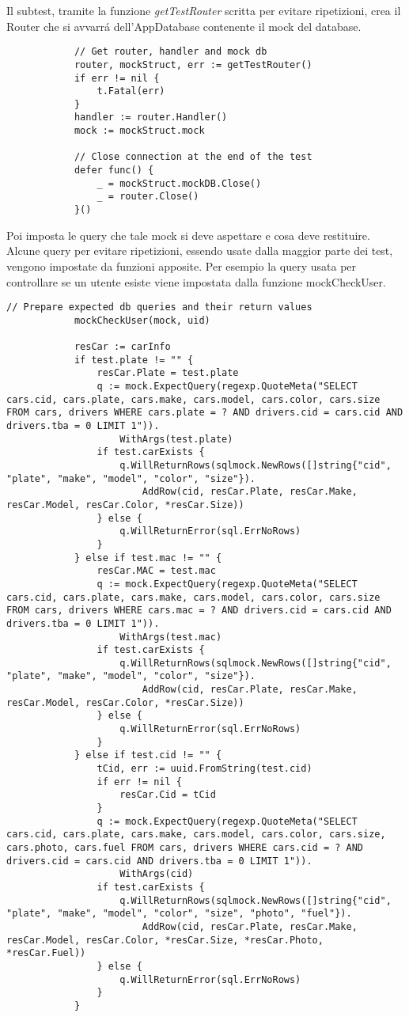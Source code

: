 \documentclass[italian, oneside]{sapthesis} %
\begin{document}
		Il subtest, tramite la funzione \textit{getTestRouter} scritta per evitare ripetizioni, crea il Router che si avvarr\'a dell'AppDatabase contenente il mock del database.

		\begin{lstlisting}
			// Get router, handler and mock db
			router, mockStruct, err := getTestRouter()
			if err != nil {
				t.Fatal(err)
			}
			handler := router.Handler()
			mock := mockStruct.mock

			// Close connection at the end of the test
			defer func() {
				_ = mockStruct.mockDB.Close()
				_ = router.Close()
			}()
		\end{lstlisting}

		\pagebreak
		Poi imposta le query che tale mock si deve aspettare e cosa deve restituire. Alcune query per evitare ripetizioni, essendo usate dalla maggior parte dei test, vengono impostate da funzioni apposite. Per esempio la query usata per controllare se un utente esiste viene impostata dalla funzione mockCheckUser. 

		\begin{lstlisting}[breaklines=true,basicstyle={\fontsize{9}{8}\ttfamily}]
			// Prepare expected db queries and their return values
			mockCheckUser(mock, uid)

			resCar := carInfo
			if test.plate != "" {
				resCar.Plate = test.plate
				q := mock.ExpectQuery(regexp.QuoteMeta("SELECT cars.cid, cars.plate, cars.make, cars.model, cars.color, cars.size FROM cars, drivers WHERE cars.plate = ? AND drivers.cid = cars.cid AND drivers.tba = 0 LIMIT 1")).
					WithArgs(test.plate)
				if test.carExists {
					q.WillReturnRows(sqlmock.NewRows([]string{"cid", "plate", "make", "model", "color", "size"}).
						AddRow(cid, resCar.Plate, resCar.Make, resCar.Model, resCar.Color, *resCar.Size))
				} else {
					q.WillReturnError(sql.ErrNoRows)
				}
			} else if test.mac != "" {
				resCar.MAC = test.mac
				q := mock.ExpectQuery(regexp.QuoteMeta("SELECT cars.cid, cars.plate, cars.make, cars.model, cars.color, cars.size FROM cars, drivers WHERE cars.mac = ? AND drivers.cid = cars.cid AND drivers.tba = 0 LIMIT 1")).
					WithArgs(test.mac)
				if test.carExists {
					q.WillReturnRows(sqlmock.NewRows([]string{"cid", "plate", "make", "model", "color", "size"}).
						AddRow(cid, resCar.Plate, resCar.Make, resCar.Model, resCar.Color, *resCar.Size))
				} else {
					q.WillReturnError(sql.ErrNoRows)
				}
			} else if test.cid != "" {
				tCid, err := uuid.FromString(test.cid)
				if err != nil {
					resCar.Cid = tCid
				}
				q := mock.ExpectQuery(regexp.QuoteMeta("SELECT cars.cid, cars.plate, cars.make, cars.model, cars.color, cars.size, cars.photo, cars.fuel FROM cars, drivers WHERE cars.cid = ? AND drivers.cid = cars.cid AND drivers.tba = 0 LIMIT 1")).
					WithArgs(cid)
				if test.carExists {
					q.WillReturnRows(sqlmock.NewRows([]string{"cid", "plate", "make", "model", "color", "size", "photo", "fuel"}).
						AddRow(cid, resCar.Plate, resCar.Make, resCar.Model, resCar.Color, *resCar.Size, *resCar.Photo, *resCar.Fuel))
				} else {
					q.WillReturnError(sql.ErrNoRows)
				}
			}
		\end{lstlisting}
\end{document}

